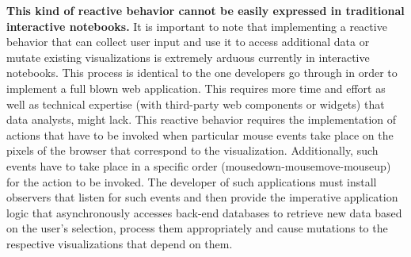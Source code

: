 {\bf This kind of reactive behavior cannot be easily expressed in traditional interactive notebooks.} It is important to note that implementing a reactive behavior that can collect user input and use it to access additional data or mutate existing visualizations is extremely arduous currently in interactive notebooks. This process is identical to the one developers go through in order to implement a full blown web application. This requires more time and effort as well as technical expertise (with third-party web components or widgets) that data analysts, might lack. This reactive behavior requires the implementation of actions that have to be invoked when particular mouse events take place on the pixels of the browser that correspond to the visualization. Additionally, such events have to take place in a specific order (mousedown-mousemove-mouseup) for the action to be invoked. The developer of such applications must install observers that listen for such events and then provide the imperative application logic that asynchronously accesses back-end databases to retrieve new data based on the user's selection, process them appropriately and cause mutations to the respective visualizations that depend on them.

